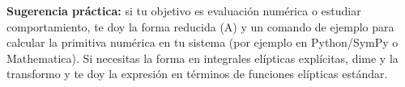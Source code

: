 \nopagebreak
\textbf{Sugerencia práctica:} si tu objetivo es evaluación numérica o estudiar comportamiento, te doy la forma reducida (A) y un comando de ejemplo para calcular la primitiva numérica en tu sistema (por ejemplo en Python/SymPy o Mathematica). Si necesitas la forma en integrales elípticas explícitas, dime y la transformo y te doy la expresión en términos de funciones elípticas estándar.

